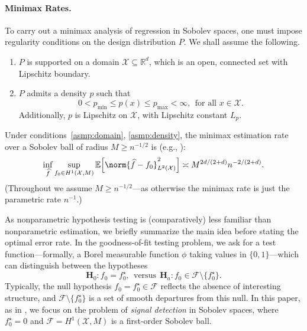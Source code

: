 \documentclass[twoside]{article}
\newcommand{\Reals}{\mathbb{R}}
\newcommand{\1}{\mathbf{1}}
\newcommand{\Rd}{\Reals^d}
\newcommand{\Xset}{\mathcal{X}}
\newcommand{\mc}[1]{\mathcal{#1}}
\newcommand{\Ebb}{\mathbb{E}}
\newcommand{\wh}[1]{\widehat{#1}}
\theoremstyle{definition}
\theoremstyle{remark}
\begin{document}
\paragraph{Minimax Rates.}

To carry out a minimax analysis of regression in Sobolev spaces, one must impose regularity conditions on the design distribution $P$. We shall assume the following.
\begin{enumerate}[label=(P\arabic*)]
	\item
	\label{asmp:domain}
	$P$ is supported on a domain $\Xset \subseteq \Rd$, which is an open, connected set with Lipschitz boundary.
	\item
	\label{asmp:density} 
	$P$ admits a density $p$ such that
	\begin{equation*}
	0 < p_{\min} \leq p(x) \leq p_{\max} < \infty, ~~\textrm{for all $x \in \Xset$}.
	\end{equation*}
	Additionally, $p$ is Lipschitz on $\Xset$, with Lipschitz constant $L_p$.
\end{enumerate}

Under conditions~\ref{asmp:domain}, \ref{asmp:density}, the minimax estimation rate over a Sobolev ball of radius $M \geq n^{-1/2}$ is (e.g., \citet{tsybakov2008_book}):
\begin{equation}
\label{eqn:sobolev_space_estimation_minimax_rate}
\inf_{\wh{f}} \sup_{f_0 \in H^1(\Xset, M)} \Ebb\Bigl[\norm{\wh{f} - f_0}_{L^2(\Xset)}^2\Bigr] \asymp M^{2d/(2 + d)} n^{-2/(2 + d)}.
\end{equation}
(Throughout we assume $M \geq n^{-1/2}$---as otherwise the minimax rate is just the parametric rate $n^{-1}$.)

As nonparametric hypothesis testing is (comparatively) less familiar than nonparametric estimation, we briefly summarize the main idea before stating the optimal error rate. In the goodness-of-fit testing problem, we ask for a test function---formally, a Borel measurable function $\phi$ taking values in $\{0,1\}$---which can distinguish between the hypotheses
\begin{equation}
\mathbf{H}_0: f_0 = f_0^{\star}, ~~\textrm{versus}~~ \mathbf{H}_a: f_0 \in \mc{F} \setminus \{f_0^{\star}\}.
\end{equation} 
Typically, the null hypothesis $f_0 = f_0^{\star} \in \mc{F}$ reflects the absence of interesting structure, and $\mc{F} \setminus  \{f_0^{\star}\}$ is a set of smooth departures from this null. In this paper, as in \citet{ingster2009}, we focus on the problem of \emph{signal detection} in Sobolev spaces, where $f_0^{\star} = 0$ and $\mc{F} = H^1(\Xset,M)$ is a first-order Sobolev ball. 
\end{document}
